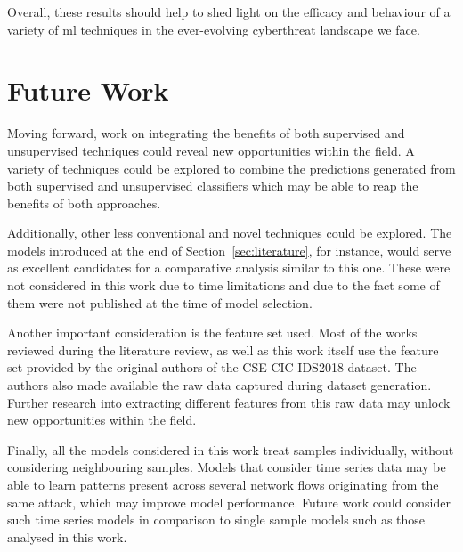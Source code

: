 Overall, these results should help to shed light on the efficacy and behaviour
of a variety of \gls{ml} techniques in the ever-evolving cyberthreat landscape
we face.

\section{Future Work}%
\label{sec:future}

Moving forward, work on integrating the benefits of both supervised and
unsupervised techniques could reveal new opportunities within the field. A
variety of techniques could be explored to combine the predictions generated
from both supervised and unsupervised classifiers which may be able to reap the
benefits of both approaches.

Additionally, other less conventional and novel techniques could be explored.
The models introduced at the end of Section~\ref{sec:literature}, for instance,
would serve as excellent candidates for a comparative analysis similar to this
one. These were not considered in this work due to time limitations and due to
the fact some of them were not published at the time of model selection.

Another important consideration is the feature set used. Most of the works
reviewed during the literature review, as well as this work itself use the
feature set provided by the original authors of the CSE-CIC-IDS2018 dataset.
The authors also made available the raw data captured during dataset
generation. Further research into extracting different features from this raw
data may unlock new opportunities within the field.

Finally, all the models considered in this work treat samples individually,
without considering neighbouring samples. Models that consider time series data
may be able to learn patterns present across several network flows originating
from the same attack, which may improve model performance. Future work could
consider such time series models in comparison to single sample models such as
those analysed in this work.